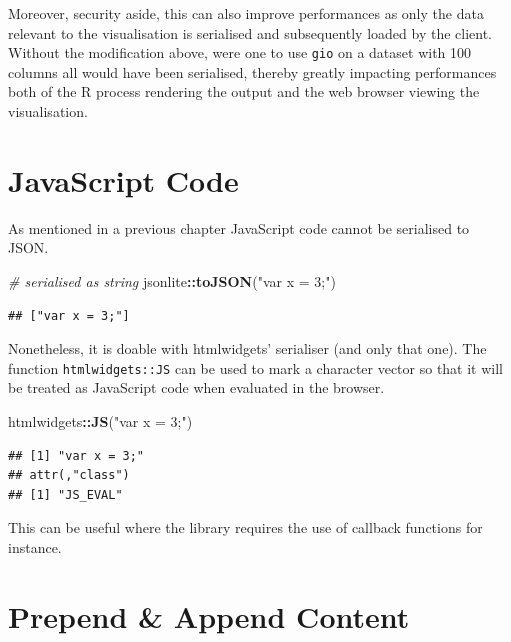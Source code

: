 \documentclass[
]{krantz}
\makeatletter
\newenvironment{Shaded}{\begin{snugshade}}{\end{snugshade}}
\newcommand{\CommentTok}[1]{\textcolor[rgb]{0.37,0.37,0.37}{\textit{#1}}}
\newcommand{\KeywordTok}[1]{\textcolor[rgb]{0.27,0.27,0.27}{\textbf{#1}}}
\newcommand{\NormalTok}[1]{#1}
\newcommand{\OperatorTok}[1]{\textcolor[rgb]{0.43,0.43,0.43}{\textbf{#1}}}
\newcommand{\StringTok}[1]{\textcolor[rgb]{0.5,0.5,0.5}{#1}}
\newenvironment{kframe}{%
\medskip{}
\setlength{\fboxsep}{.8em}
 \def\at@end@of@kframe{}%
 \ifinner\ifhmode%
  \def\at@end@of@kframe{\end{minipage}}%
  \begin{minipage}{\columnwidth}%
 \fi\fi%
 \def\FrameCommand##1{\hskip\@totalleftmargin \hskip-\fboxsep
 \colorbox{shadecolor}{##1}\hskip-\fboxsep
     \hskip-\linewidth \hskip-\@totalleftmargin \hskip\columnwidth}%
 \MakeFramed {\advance\hsize-\width
   \@totalleftmargin\z@ \linewidth\hsize
   \@setminipage}}%
 {\par\unskip\endMakeFramed%
 \at@end@of@kframe}
\renewenvironment{Shaded}{\begin{kframe}}{\end{kframe}}
\makeatother
\begin{document}
Moreover, security aside, this can also improve performances as only the data relevant to the visualisation is serialised and subsequently loaded by the client. Without the modification above, were one to use \texttt{gio} on a dataset with 100 columns all would have been serialised, thereby greatly impacting performances both of the R process rendering the output and the web browser viewing the visualisation.

\hypertarget{javascript-code-1}{%
\section*{JavaScript Code}\label{javascript-code-1}}


As mentioned in a previous chapter JavaScript code cannot be serialised to JSON.

\begin{Shaded}
\begin{Highlighting}[]
\CommentTok{\# serialised as string}
\NormalTok{jsonlite}\OperatorTok{::}\KeywordTok{toJSON}\NormalTok{(}\StringTok{"var x = 3;"}\NormalTok{)}
\end{Highlighting}
\end{Shaded}

\begin{verbatim}
## ["var x = 3;"]
\end{verbatim}

Nonetheless, it is doable with htmlwidgets' serialiser (and only that one). The function \texttt{htmlwidgets::JS} can be used to mark a character vector so that it will be treated as JavaScript code when evaluated in the browser.

\begin{Shaded}
\begin{Highlighting}[]
\NormalTok{htmlwidgets}\OperatorTok{::}\KeywordTok{JS}\NormalTok{(}\StringTok{"var x = 3;"}\NormalTok{)  }
\end{Highlighting}
\end{Shaded}

\begin{verbatim}
## [1] "var x = 3;"
## attr(,"class")
## [1] "JS_EVAL"
\end{verbatim}

This can be useful where the library requires the use of callback functions for instance.

\hypertarget{prepend-append-content}{%
\section*{Prepend \& Append Content}\label{prepend-append-content}}
\end{document}
